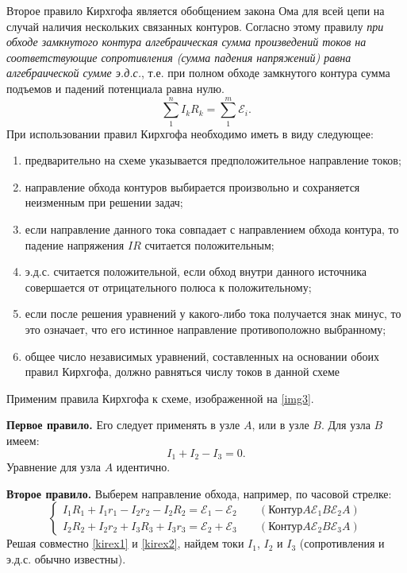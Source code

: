 \documentclass[a4paper,10pt]{book}
\begin{document}
Второе правило Кирхгофа является обобщением закона Ома для всей цепи на случай наличия нескольких связанных контуров. Согласно этому правилу \emph{при обходе замкнутого контура алгебраическая сумма произведений токов на соответствующие сопротивления (сумма падения напряжений) равна алгебраической сумме э.д.с.}, т.е. при полном обходе замкнутого контура сумма подъемов и падений потенциала равна нулю.
\begin{equation}\label{kirchgoff2}
 \sum_1^n I_kR_k = \sum_1^m\mathcal{E}_i.
\end{equation}
При использовании правил Кирхгофа необходимо иметь в виду следующее:
\begin{enumerate}
 \item предварительно на схеме указывается предположительное направление токов;
 \item направление обхода контуров выбирается произвольно и сохраняется неизменным при решении задач;
 \item если направление данного тока совпадает с направлением обхода контура, то падение напряжения $IR$ считается положительным;
 \item э.д.с. считается положительной, если обход внутри данного источника совершается от отрицательного полюса к положительному;
 \item если после решения уравнений у какого-либо тока получается знак минус, то это означает, что его истинное направление противоположно выбранному;
 \item общее число независимых уравнений, составленных на основании обоих правил Кирхгофа, должно равняться числу токов в данной схеме
\end{enumerate}

Применим правила Кирхгофа к схеме, изображенной на \ref{img3}.

\textbf{Первое правило.} Его следует применять в узле $A$, или в узле $B$. Для узла $B$ имеем:
\begin{equation}\label{kirex1}
 I_1 + I_2 - I_3 = 0.
\end{equation}
Уравнение для узла $A$ идентично.

\textbf{Второе правило.} Выберем направление обхода, например, по часовой стрелке:
\begin{equation}\label{kirex2}
 \begin{cases}
    I_1R_1 + I_1r_1 - I_2r_2 - I_2R_2 = \mathcal{E}_1 - \mathcal{E}_2 \;\;\;\;\;\;\;(\text{Контур} A\mathcal{E}_1B\mathcal{E}_2A)\\
    I_2R_2 + I_2r_2 + I_3R_3 + I_3r_3 = \mathcal{E}_2 + \mathcal{E}_3 \;\;\;\;\;\;\;(\text{Контур} A\mathcal{E}_2B\mathcal{E}_3A)
 \end{cases}
\end{equation}
Решая совместно \ref{kirex1} и \ref{kirex2}, найдем токи $I_1$, $I_2$ и $I_3$ (сопротивления и э.д.с. обычно известны).
\end{document}
